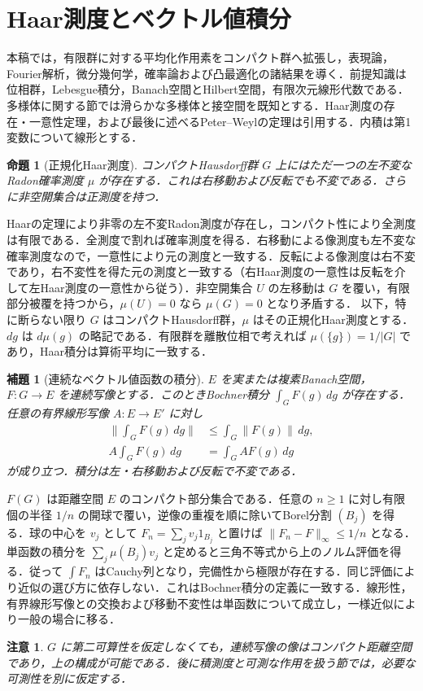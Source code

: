 \documentclass[a5paper,10pt,onecolumn]{jsarticle}
\makeatletter
\theoremstyle{mathnotetheorem}
\newtheorem{lemma}[theorem]{補題}
\newtheorem{proposition}[theorem]{命題}
\newtheorem{remark}[theorem]{注意}
\renewcommand{\proofname}{証明}
\renewenvironment{proof}[1][\proofname]{%
  \par\pushQED{\qed}\normalfont\topsep4\p@\@plus2\p@\relax
  \trivlist\item[\hskip\labelsep\bfseries #1]\ignorespaces
}{\popQED\endtrivlist\@endpefalse}
\newcommand{\norm}[1]{\lVert #1\rVert}
\makeatother
\begin{document}
\section{Haar測度とベクトル値積分}
本稿では，有限群に対する平均化作用素をコンパクト群へ拡張し，表現論，Fourier解析，微分幾何学，確率論および凸最適化の諸結果を導く．前提知識は位相群，Lebesgue積分，Banach空間とHilbert空間，有限次元線形代数である．多様体に関する節では滑らかな多様体と接空間を既知とする．Haar測度の存在・一意性定理，および最後に述べるPeter--Weylの定理は引用する．内積は第1変数について線形とする．

\begin{proposition}[正規化Haar測度]\label{haar}
コンパクトHausdorff群 $G$ 上にはただ一つの左不変なRadon確率測度 $\mu$ が存在する．これは右移動および反転でも不変である．さらに非空開集合は正測度を持つ．
\end{proposition}
\begin{proof}
Haarの定理により非零の左不変Radon測度が存在し，コンパクト性により全測度は有限である．全測度で割れば確率測度を得る．右移動による像測度も左不変な確率測度なので，一意性により元の測度と一致する．反転による像測度は右不変であり，右不変性を得た元の測度と一致する（右Haar測度の一意性は反転を介して左Haar測度の一意性から従う）．非空開集合 $U$ の左移動は $G$ を覆い，有限部分被覆を持つから，$\mu(U)=0$ なら $\mu(G)=0$ となり矛盾する．
\end{proof}
以下，特に断らない限り $G$ はコンパクトHausdorff群，$\mu$ はその正規化Haar測度とする．$dg$ は $d\mu(g)$ の略記である．有限群を離散位相で考えれば $\mu(\{g\})=1/|G|$ であり，Haar積分は算術平均に一致する．

\begin{lemma}[連続なベクトル値函数の積分]\label{bochner}
$E$ を実または複素Banach空間，$F:G\to E$ を連続写像とする．このときBochner積分 $\int_G F(g)\,dg$ が存在する．任意の有界線形写像 $A:E\to E'$ に対し
\begin{align*}
 \norm{\int_G F(g)\,dg}&\le\int_G\norm{F(g)}\,dg,\\
 A\int_G F(g)\,dg&=\int_G AF(g)\,dg
\end{align*}
が成り立つ．積分は左・右移動および反転で不変である．
\end{lemma}
\begin{proof}
$F(G)$ は距離空間 $E$ のコンパクト部分集合である．任意の $n\ge1$ に対し有限個の半径 $1/n$ の開球で覆い，逆像の重複を順に除いてBorel分割 $(B_j)$ を得る．球の中心を $v_j$ として $F_n=\sum_j v_j1_{B_j}$ と置けば $\norm{F_n-F}_\infty\le1/n$ となる．単函数の積分を $\sum_j\mu(B_j)v_j$ と定めると三角不等式から上のノルム評価を得る．従って $\int F_n$ はCauchy列となり，完備性から極限が存在する．同じ評価により近似の選び方に依存しない．これはBochner積分の定義に一致する．線形性，有界線形写像との交換および移動不変性は単函数について成立し，一様近似により一般の場合に移る．
\end{proof}
\begin{remark}
$G$ に第二可算性を仮定しなくても，連続写像の像はコンパクト距離空間であり，上の構成が可能である．後に積測度と可測な作用を扱う節では，必要な可測性を別に仮定する．
\end{remark}
\end{document}
